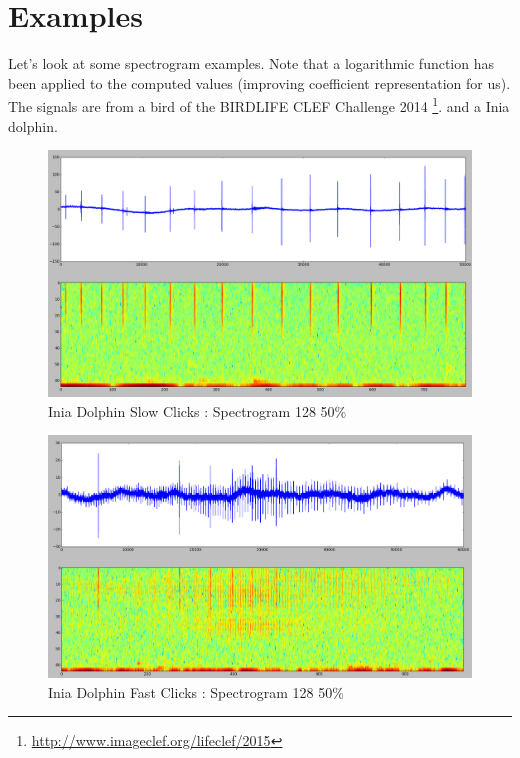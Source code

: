 \documentclass[a4paper]{report}
\begin{document}
\section{Examples}
Let's look at some spectrogram examples. Note that a logarithmic function has been applied to the computed values (improving coefficient representation for us).
The signals are from a bird of the BIRDLIFE CLEF Challenge 2014 \footnote{\url{http://www.imageclef.org/lifeclef/2015}}.
 and a Inia dolphin.
\begin{figure}[H]
\begin{center}
\includegraphics[scale=0.21]{fftslow.png}\caption{Inia Dolphin Slow Clicks : Spectrogram 128 50\%}
\end{center}
\end{figure}

\begin{figure}[H]
\begin{center}
\includegraphics[scale=0.21]{fftfast.png}\caption{Inia Dolphin Fast Clicks : Spectrogram 128 50\%}
\end{center}
\end{figure}
\end{document}
